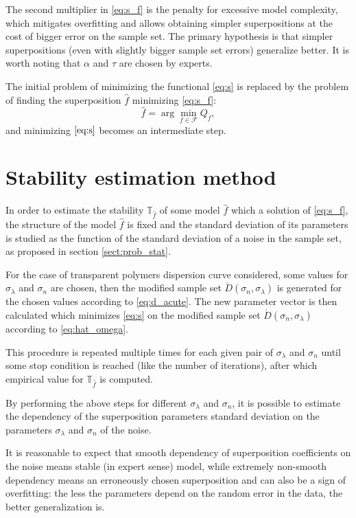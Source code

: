 \documentclass[11pt,a4paper]{article}
\theoremstyle{definition}
\begin{document}
The second multiplier in \eqref{eq:s_f} is the penalty for excessive model complexity,
which mitigates overfitting and allows obtaining simpler superpositions at the cost of
bigger error on the sample set. The primary hypothesis is that simpler superpositions
(even with slightly bigger sample set errors) generalize better. It is worth noting that
$\alpha$ and $\tau$ are chosen by experts.

The initial problem of minimizing the functional \eqref{eq:s} is replaced by
the problem of finding the superposition $\hat{f}$ minimizing \eqref{eq:s_f}:
\begin{equation}
  \hat{f} = \arg \min_{f \in \mathcal{F}} Q_f,
  \label{eq:s_f_min}
\end{equation}
and minimizing $\eqref{eq:s}$ becomes an intermediate step.

\section{Stability estimation method}

In order to estimate the stability $\mathbb{T}_{\hat{f}}$ of some model $\hat{f}$
which a solution of \eqref{eq:s_f}, the structure of the model $\hat{f}$ is fixed
and the standard deviation of its parameters is studied as the function of the
standard deviation of a noise in the sample set, as proposed in section
\ref{sect:prob_stat}.

For the case of transparent polymers dispersion curve considered,
some values for $\sigma_{\lambda}$ and $\sigma_n$ are chosen,
then the modified sample set $\acute{D}(\sigma_n, \sigma_{\lambda})$ is
generated for the chosen values according to \eqref{eq:d_acute}. The new
parameter vector is then calculated which minimizes \eqref{eq:s} on the
modified sample set $\acute{D}(\sigma_n, \sigma_{\lambda})$ according to
\eqref{eq:hat_omega}.

This procedure is repeated multiple times for each given pair of $\sigma_{\lambda}$ and $\sigma_n$
until some stop condition is reached (like the number of iterations), after which
empirical value for $\mathbb{T}_{\hat{f}}$ is computed.

By performing the above steps for different $\sigma_{\lambda}$ and $\sigma_n$,
it is possible to estimate the dependency of the superposition parameters
standard deviation on the parameters $\sigma_{\lambda}$ and $\sigma_n$ of the noise.

It is reasonable to expect that smooth dependency of superposition coefficients
on the noise means stable (in expert sense) model, while extremely
non-smooth dependency means an erroneously chosen superposition and can also be
a sign of overfitting: the less the parameters depend on the random error
in the data, the better generalization is.
\end{document}

